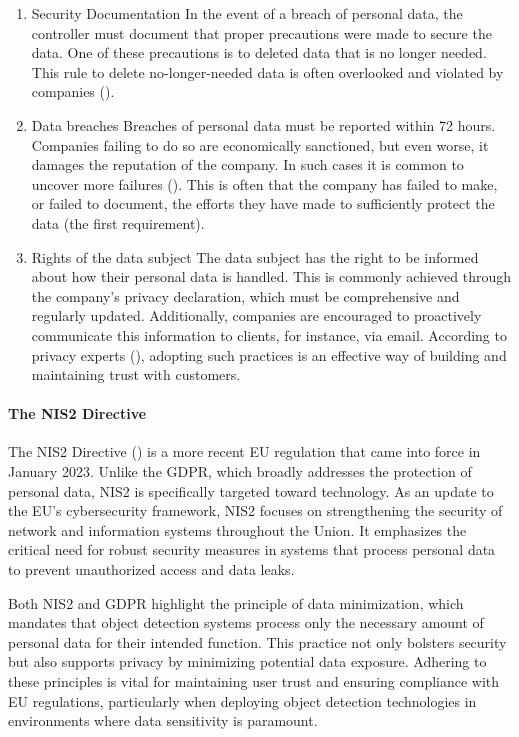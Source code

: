 \begin{enumerate}
    \item{Security Documentation}
          In the event of a breach of personal data, the controller must document that proper precautions were made to secure the data. One of these precautions is to deleted data that is no longer needed. This rule to delete no-longer-needed data is often overlooked and violated by companies (\cite{sa2022webinar_gdpr}).
    \item{Data breaches}
          Breaches of personal data must be reported within 72 hours. Companies failing to do so are economically sanctioned, but even worse, it damages the reputation of the company. In such cases it is common to uncover more failures (\cite{sa2022webinar_gdpr}). This is often that the company has failed to make, or failed to document, the efforts they have made to sufficiently protect the data (the first requirement).
    \item{Rights of the data subject}
          The data subject has the right to be informed about how their personal data is handled. This is commonly achieved through the company's privacy declaration, which must be comprehensive and regularly updated. Additionally, companies are encouraged to proactively communicate this information to clients, for instance, via email. According to privacy experts (\cite{sa2022webinar_gdpr}), adopting such practices is an effective way of building and maintaining trust with customers.
\end{enumerate}

\paragraph{The NIS2 Directive}
\label{sec:NIS2_relevance}

The NIS2 Directive (\cite{eu2022nis2}) is a more recent EU regulation that came into force in January 2023. Unlike the GDPR, which broadly addresses the protection of personal data, NIS2 is specifically targeted toward technology. As an update to the EU's cybersecurity framework, NIS2 focuses on strengthening the security of network and information systems throughout the Union. It emphasizes the critical need for robust security measures in systems that process personal data to prevent unauthorized access and data leaks.

Both NIS2 and GDPR highlight the principle of data minimization, which mandates that object detection systems process only the necessary amount of personal data for their intended function. This practice not only bolsters security but also supports privacy by minimizing potential data exposure. Adhering to these principles is vital for maintaining user trust and ensuring compliance with EU regulations, particularly when deploying object detection technologies in environments where data sensitivity is paramount.

